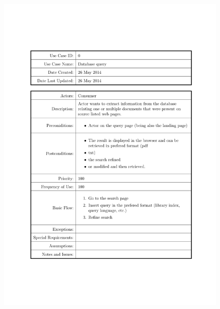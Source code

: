 \documentclass{tufte-book}
\begin{document}
\begin{figure}[h] \includegraphics[width=\linewidth]{Requirements/UseCases/000_Query.pdf}\end{figure}
\end{document}
